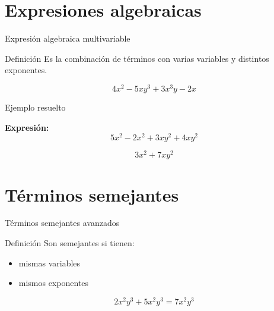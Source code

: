 \section{Expresiones algebraicas}
\begin{frame}{Expresión algebraica multivariable}
	
	\begin{block}{Definición}
		Es la combinación de términos con varias variables y distintos exponentes.
	\end{block}
	
	\pause
	
	\[
	4x^2 - 5xy^3 + 3x^3y - 2x
	\]
	
	\pause
	
	
\end{frame}

\begin{frame}{Ejemplo resuelto}
	
	
	\pause
	
	\textbf{Expresión:}
	\[
	5x^2 -2x^2 + 3xy^2 + 4xy^2
	\]
	
	\pause
	
	\[
	3x^2 + 7xy^2
	\]
	
	\pause
	
	
\end{frame}

\section{Términos semejantes}
\begin{frame}{Términos semejantes avanzados}
	
	\begin{block}{Definición}
		Son semejantes si tienen:
		
		\begin{itemize}
			\item mismas variables
			\pause
			\item mismos exponentes
		\end{itemize}
	\end{block}
	
	\pause
	
	\[
	2x^2y^3 + 5x^2y^3 = 7x^2y^3
	\]
	
\end{frame}

